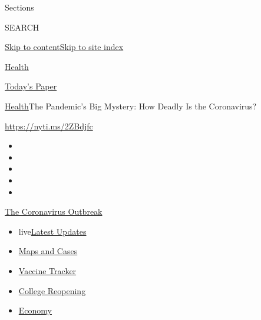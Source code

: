 Sections

SEARCH

\protect\hyperlink{site-content}{Skip to
content}\protect\hyperlink{site-index}{Skip to site index}

\href{https://www.nytimes3xbfgragh.onion/section/health}{Health}

\href{https://myaccount.nytimes3xbfgragh.onion/auth/login?response_type=cookie\&client_id=vi}{}

\href{https://www.nytimes3xbfgragh.onion/section/todayspaper}{Today's
Paper}

\href{/section/health}{Health}\textbar{}The Pandemic's Big Mystery: How
Deadly Is the Coronavirus?

\url{https://nyti.ms/2ZBdjfc}

\begin{itemize}
\item
\item
\item
\item
\item
\end{itemize}

\href{https://www.nytimes3xbfgragh.onion/news-event/coronavirus?action=click\&pgtype=Article\&state=default\&region=TOP_BANNER\&context=storylines_menu}{The
Coronavirus Outbreak}

\begin{itemize}
\tightlist
\item
  live\href{https://www.nytimes3xbfgragh.onion/2020/08/04/world/coronavirus-cases.html?action=click\&pgtype=Article\&state=default\&region=TOP_BANNER\&context=storylines_menu}{Latest
  Updates}
\item
  \href{https://www.nytimes3xbfgragh.onion/interactive/2020/us/coronavirus-us-cases.html?action=click\&pgtype=Article\&state=default\&region=TOP_BANNER\&context=storylines_menu}{Maps
  and Cases}
\item
  \href{https://www.nytimes3xbfgragh.onion/interactive/2020/science/coronavirus-vaccine-tracker.html?action=click\&pgtype=Article\&state=default\&region=TOP_BANNER\&context=storylines_menu}{Vaccine
  Tracker}
\item
  \href{https://www.nytimes3xbfgragh.onion/2020/08/02/us/covid-college-reopening.html?action=click\&pgtype=Article\&state=default\&region=TOP_BANNER\&context=storylines_menu}{College
  Reopening}
\item
  \href{https://www.nytimes3xbfgragh.onion/live/2020/08/04/business/stock-market-today-coronavirus?action=click\&pgtype=Article\&state=default\&region=TOP_BANNER\&context=storylines_menu}{Economy}
\end{itemize}

